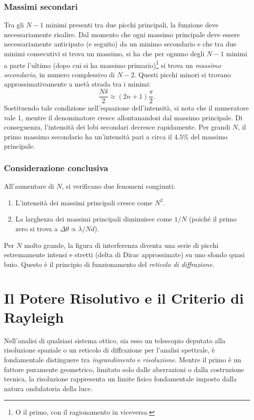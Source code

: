 \documentclass[a4paper,11pt]{report}
\begin{document}
\subsubsection{Massimi secondari}
Tra gli $N-1$ minimi presenti tra due picchi principali, la funzione deve necessariamente risalire. Dal momento che ogni massimo principale deve essere necessariamente anticipato (e seguito) da un minimo secondario e che tra due minimi consecutivi si trova un massimo, si ha che per ognuno degli $N-1$ minimi a parte l'ultimo (dopo cui si ha massimo primario)\footnote{O il primo, con il ragionamento in viceversa.} si trova un \textit{massimo secondario}, in numero complessivo di $N-2$.
Questi picchi minori si trovano approssimativamente a metà strada tra i minimi:
\begin{equation}
    \frac{N\delta}{2} \approx (2n+1)\frac{\pi}{2}.
\end{equation}
Sostituendo tale condizione nell'equazione dell'intensità, si nota che il numeratore vale 1, mentre il denominatore cresce allontanandosi dal massimo principale. Di conseguenza, l'intensità dei lobi secondari decresce rapidamente.
Per grandi $N$, il primo massimo secondario ha un'intensità pari a circa il $4.5\%$ del massimo principale.

\subsubsection{Considerazione conclusiva}
All'aumentare di $N$, si verificano due fenomeni congiunti:
\begin{enumerate}
    \item L'intensità dei massimi principali cresce come $N^2$.
    \item La larghezza dei massimi principali diminuisce come $1/N$ (poiché il primo zero si trova a $\Delta \theta \propto \lambda/Nd$).
\end{enumerate}
Per $N$ molto grande, la figura di interferenza diventa una serie di picchi estremamente intensi e stretti (delta di Dirac approssimate) su uno sfondo quasi buio. Questo è il principio di funzionamento del \textit{reticolo di diffrazione}.


\section{Il Potere Risolutivo e il Criterio di Rayleigh}
Nell'analisi di qualsiasi sistema ottico, sia esso un telescopio deputato alla risoluzione spaziale o un reticolo di diffrazione per l'analisi spettrale, è fondamentale distinguere tra \textit{ingrandimento} e \textit{risoluzione}. Mentre il primo è un fattore puramente geometrico, limitato solo dalle aberrazioni o dalla costruzione tecnica, la risoluzione rappresenta un limite fisico fondamentale imposto dalla natura ondulatoria della luce.\\
\end{document}

